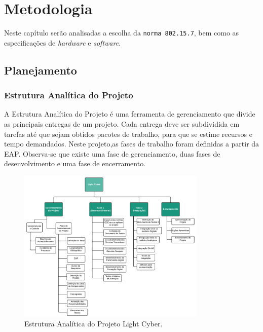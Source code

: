 	\chapter{Metodologia}\label{cap-metodologia}
	
	Neste capítulo serão analisadas a escolha da \texttt{norma 802.15.7}, bem como as especificações de \textit{hardware} e \textit{software}.
	
	\section{Planejamento}\label{sec-planejamento}
	
	\subsection{Estrutura Analítica do Projeto}\label{subsec-eap}
	
	A Estrutura Analítica do Projeto é uma ferramenta de gerenciamento que divide as principais entregas de um projeto. Cada entrega deve ser subdividida em tarefas até que sejam obtidos pacotes de trabalho, para que se estime recursos e tempo demandados. Neste projeto,as fases de trabalho foram definidas a partir da EAP. Observa-se que existe uma fase de gerenciamento, duas fases de desenvolvimento e uma fase de encerramento.
	
	\begin{figure}[h!]
		\caption{\label{fig_eap}Estrutura Analítica do Projeto Light Cyber.}
		\centering
		\includegraphics[width=0.8\textwidth, trim={0cm 0cm 0cm 0cm}, clip]{EAP.pdf}
	\end{figure}
	
